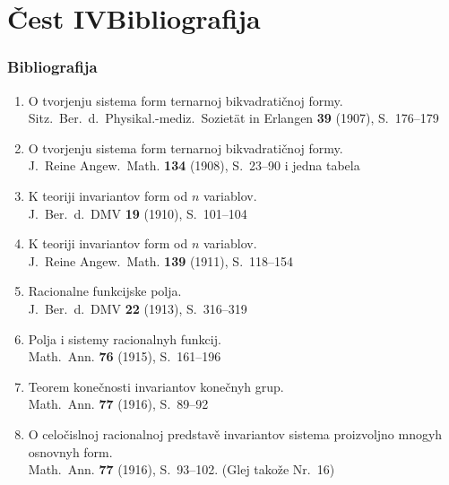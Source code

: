 \documentclass[11pt]{article}
\newcommand{\foreign}[1]{#1}
\begin{document}
\part*{Čest IV\hspace{1em}Bibliografija}

\section*{Bibliografija}

\begin{enumerate}[label={\small\arabic*.},leftmargin=2em,itemsep=0.3em]
\item O tvorjenju sistema form ternarnoj bikvadratičnoj formy.\\
\foreign{Sitz.\ Ber.\ d.\ Physikal.-mediz.\ Sozietät in Erlangen} \textbf{39} (1907), S.~176--179

\item O tvorjenju sistema form ternarnoj bikvadratičnoj formy.\\
\foreign{J.\ Reine Angew.\ Math.} \textbf{134} (1908), S.~23--90 i jedna tabela

\item K teoriji invariantov form od $n$ variablov.\\
\foreign{J.\ Ber.\ d.\ DMV} \textbf{19} (1910), S.~101--104

\item K teoriji invariantov form od $n$ variablov.\\
\foreign{J.\ Reine Angew.\ Math.} \textbf{139} (1911), S.~118--154

\item Racionalne funkcijske polja.\\
\foreign{J.\ Ber.\ d.\ DMV} \textbf{22} (1913), S.~316--319

\item Polja i sistemy racionalnyh funkcij.\\
\foreign{Math.\ Ann.} \textbf{76} (1915), S.~161--196

\item Teorem konečnosti invariantov konečnyh grup.\\
\foreign{Math.\ Ann.} \textbf{77} (1916), S.~89--92

\item O celočislnoj racionalnoj predstavě invariantov sistema proizvoljno mnogyh osnovnyh form.\\
\foreign{Math.\ Ann.} \textbf{77} (1916), S.~93--102. (Glej takože Nr.~16)


\end{enumerate}
\end{document}
